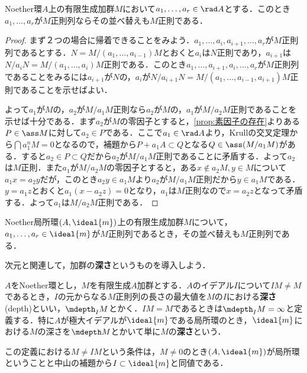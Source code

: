 \begin{prop}
	Noether環$A$上の有限生成加群$M$において$a_1,\dots,a_r\in\rad A$とする．このとき$a_1,\dots,a_r$が$M$正則列ならその並べ替えも$M$正則である．
\end{prop}

\begin{proof}
	まず２つの場合に帰着できることをみよう．$a_1,\dots,a_i,a_{i+1},\dots,a_r$が$M$正則列であるとする．$N=M/(a_1,\dots,a_{i-1})M$とおくと$a_i$は$N$正則であり，$a_{i+1}$は$N/a_iN=M/(a_1,\dots,a_i)M$正則である．このとき$a_1,\dots,a_{i+1},a_i,\dots,a_r$が$M$正則列であることをみるには$a_{i+1}$が$N$の，$a_i$が$N/a_{i+1}N=M/(a_1,\dots,a_{i-1},a_{i+1})M$正則であることを示せばよい．
	
	よって$a_1$が$M$の，$a_2$が$M/a_1M$正則なら$a_2$が$M$の，$a_1$が$M/a_2M$正則であることを示せば十分である．まず$a_2$が$M$の零因子とすると，\ref{prop:素因子の存在}よりある$P\in\ass M$に対して$a_2\in P$である．ここで$a_1\in\rad A$より，Krullの交叉定理から$\bigcap a_1^nM=0$となるので，補題から$P+a_1A \subset Q$となる$Q\in\ass (M/a_1M)$がある．すると$a_2\in P\subset Q$だから$a_2$が$M/a_1M$正則であることに矛盾する．よって$a_2$は$M$正則．また$a_1$が$M/a_2M$の零因子とすると，ある$x\not\in a_2M,y\in M$について$a_1x=a_2y$だが，このとき$a_2y\in a_1M$より$a_2$が$M/a_1M$正則だから$y\in a_1M$である．$y=a_1z$とおくと$a_1(x-a_2z)=0$となり，$a_1$は$M$正則なので$x=a_2z$となって矛盾する．よって$a_1$は$M/a_2M$正則である．
\end{proof}

\begin{cor}
	Noether局所環$(A,\ideal{m})$上の有限生成加群$M$について，$a_1,\dots,a_r\in\ideal{m}$が$M$正則列であるとき，その並べ替えも$M$正則列である．
\end{cor}

次元と関連して，加群の\textbf{深さ}というものを導入しよう．

\begin{defi}[深さ]
	$A$をNoether環とし，$M$を有限生成$A$加群とする．$A$のイデアル$I$について$IM\neq M$であるとき，$I$の元からなる$M$正則列の長さの最大値を$M$の$I$における\textbf{深さ}(depth)といい，$\mdepth_I M$とかく．$IM=M$であるときは$\mdepth_I M=\infty$と定義する．特に$A$が極大イデアルが$\ideal{m}$である局所環のとき，$\ideal{m}$における$M$の深さを$\mdepth M$とかいて単に$M$の\textbf{深さ}という．
\end{defi}

この定義における$M\neq IM$という条件は，$M\neq0$のとき$(A,\ideal{m})$が局所環ということと中山の補題から$I\subset\ideal{m}$と同値である．

